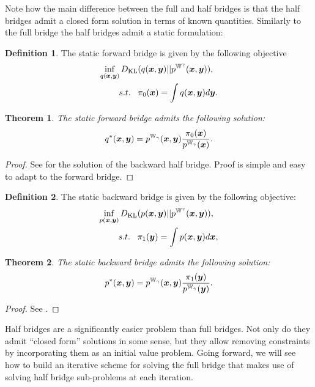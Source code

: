 \documentclass[a4paper,12pt,twoside,openright]{report}
\newtheorem{theorem}{Theorem}
\theoremstyle{definition}
\newtheorem{definition}{Definition}[section]
\begin{document}
Note how the main difference between the full and half bridges is that the half bridges admit a closed form solution in terms of known quantities. Similarly to the full bridge the half bridges admit a static formulation:

\begin{definition}
The static forward bridge is given by the following objective
 \begin{align}\label{eq:static_bridge_forward}
        \inf_{q({\bm{x}},{\bm{y}})} D_{\mathrm{KL}}  &(q({\bm{x}},{\bm{y}}) || p^{\mathbb{W}^{\gamma}}({\bm{x}},{\bm{y}})), \nonumber \\
        s.t. \;\;\;& \pi_0({\bm{x}}) = \int q({\bm{x}},{\bm{y}}) d{\bm{y}}.
\end{align}
\end{definition}
\begin{theorem}\label{thrm:static_half_forward}
     The static forward bridge admits the following solution:
     \begin{align}
         q^{*}({\bm{x}},{\bm{y}}) = p^{\mathbb{W}_{\gamma}}({\bm{x}}, {\bm{y}})\frac{\pi_0({\bm{x}})}{p^{\mathbb{W}_{\gamma}}({\bm{x}})}.
     \end{align}
\end{theorem}
\begin{proof}
See \cite{pavon2018data} for the solution of the backward half bridge. Proof is simple and easy to adapt to the forward bridge. 
\end{proof}
\begin{definition}
The static backward bridge is given by the following objective:
 \begin{align}\label{eq:static_bridge_backward}
        \inf_{p({\bm{x}},{\bm{y}})} D_{\mathrm{KL}}  &(p({\bm{x}},{\bm{y}}) || p^{\mathbb{W}^{\gamma}}({\bm{x}},{\bm{y}})), \nonumber \\
        s.t. \;\;\;& \pi_1({\bm{y}}) = \int p({\bm{x}},{\bm{y}}) d{\bm{x}}, 
\end{align}
\end{definition}
\begin{theorem}\label{thrm:static_half_backward}
     The static backward bridge admits the following solution:
     \begin{align}
         p^{*}({\bm{x}},{\bm{y}}) = p^{\mathbb{W}_{\gamma}}({\bm{x}}, {\bm{y}})\frac{\pi_1({\bm{y}})}{p^{\mathbb{W}_{\gamma}}({\bm{y}})}.
     \end{align}
\end{theorem}
\begin{proof}
See \cite{pavon2018data}.
\end{proof}

Half bridges are a significantly easier problem than full bridges. Not only do they admit ``closed form'' solutions in some sense, but they allow removing constraints by incorporating them as an initial value problem. Going forward, we will see how to build an iterative scheme for solving the full bridge that makes use of solving half bridge sub-problems at each iteration.
\end{document}

